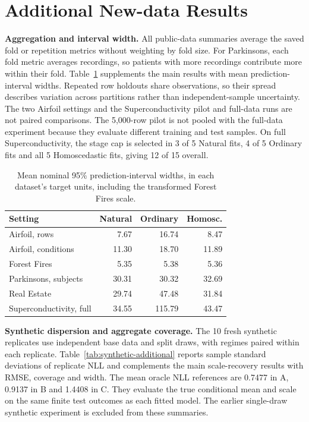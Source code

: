 \section{Additional New-data Results}
\label{app:new-results-details}

\textbf{Aggregation and interval width.}
All public-data summaries average the saved fold or repetition metrics without weighting by fold size.
For Parkinsons, each fold metric averages recordings, so patients with more recordings contribute more within their fold.
Table~\ref{tab:new-widths} supplements the main results with mean prediction-interval widths.
Repeated row holdouts share observations, so their spread describes variation across partitions rather than independent-sample uncertainty.
The two Airfoil settings and the Superconductivity pilot and full-data runs are not paired comparisons.
The 5{,}000-row pilot is not pooled with the full-data experiment because they evaluate different training and test samples.
On full Superconductivity, the stage cap is selected in 3 of 5 Natural fits, 4 of 5 Ordinary fits and all 5 Homoscedastic fits, giving 12 of 15 overall.

\begin{table}[t]
\centering
\small
\setlength{\tabcolsep}{4pt}
\begin{tabular}{@{}lrrr@{}}
\toprule
Setting & Natural & Ordinary & Homosc. \\
\midrule
Airfoil, rows & 7.67 & 16.74 & 8.47 \\
Airfoil, conditions & 11.30 & 18.70 & 11.89 \\
Forest Fires & 5.35 & 5.38 & 5.36 \\
Parkinsons, subjects & 30.31 & 30.32 & 32.69 \\
Real Estate & 29.74 & 47.48 & 31.84 \\
Superconductivity, full & 34.55 & 115.79 & 43.47 \\
\bottomrule
\end{tabular}
\caption{Mean nominal 95\% prediction-interval widths, in each dataset's target units, including the transformed Forest Fires scale.}
\label{tab:new-widths}
\end{table}

\textbf{Synthetic dispersion and aggregate coverage.}
The 10 fresh synthetic replicates use independent base data and split draws, with regimes paired within each replicate.
Table~\ref{tab:synthetic-additional} reports sample standard deviations of replicate NLL and complements the main scale-recovery results with RMSE, coverage and width.
The mean oracle NLL references are 0.7477 in A, 0.9137 in B and 1.4408 in C.
They evaluate the true conditional mean and scale on the same finite test outcomes as each fitted model.
The earlier single-draw synthetic experiment is excluded from these summaries.

